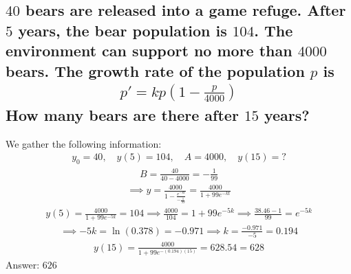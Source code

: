 \documentclass{article}
\begin{document}
\subsection{$40$ bears are released into a game refuge. After $5$ years, the bear population is $104$. The environment can support no more than $4000$ bears. The growth rate of the population $p$ is
	\begin{align*}
		p' = kp(1 - \frac{p}{4000})
	\end{align*}
How many bears are there after $15$ years?}
We gather the following information:
\begin{align*}
	y_0 = 40, \quad y(5) = 104, \quad A = 4000, \quad y(15) = ?
\end{align*}
\begin{align*}
	B = \frac{40}{40 - 4000} = -\frac{1}{99}
\end{align*}
\begin{align*}
	\implies y = \frac{4000}{1 - \frac{e^{-kt}}{-\frac{1}{99}}} = \frac{4000}{1 + 99e^{-kt}}
\end{align*}
\begin{align*}
	y(5) = \frac{4000}{1 + 99e^{-5k}} = 104 \implies \frac{4000}{104} = 1 + 99e^{-5k} \implies \frac{38.46 - 1}{99} = e^{-5k}
\end{align*}
\begin{align*}
	\implies -5k = \ln{(0.378)} = -0.971 \implies k = \frac{-0.971}{-5} = 0.194
\end{align*}
\begin{align*}
	y(15) = \frac{4000}{1 + 99e^{-(0.194)(15)}} = 628.54 = 628
\end{align*}
Answer: $626$

\end{document}
